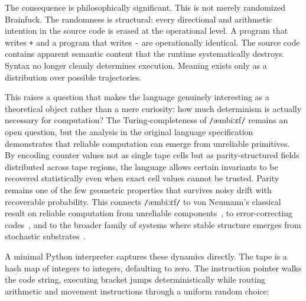 \documentclass[12pt]{article}
\newcommand{\ambibf}{%
  \texttt{/}\textnormal{æmbiːɛf}\texttt{/}%
}
\begin{document}
The consequence is philosophically significant. This is not merely randomized
Brainfuck. The randomness is structural: every directional and arithmetic
intention in the source code is erased at the operational level. A program that
writes \texttt{+} and a program that writes \texttt{-} are operationally
identical. The source code contains apparent semantic content that the runtime
systematically destroys. Syntax no longer cleanly determines execution. Meaning
exists only as a distribution over possible trajectories.

This raises a question that makes the language genuinely interesting as a
theoretical object rather than a mere curiosity: how much determinism is
actually necessary for computation? The Turing-completeness of
\ambibf{} remains an open question, but
the analysis in the original language specification demonstrates that reliable
computation can emerge from unreliable primitives. By encoding counter values
not as single tape cells but as parity-structured fields distributed across tape
regions, the language allows certain invariants to be recovered statistically
even when exact cell values cannot be trusted. Parity remains one of the few
geometric properties that survives noisy drift with recoverable probability.
This connects \ambibf{} to von Neumann's
classical result on reliable computation from unreliable components~\cite{neumann1956},
to error-correcting codes~\cite{cover2006}, and to the broader family of systems
where stable structure emerges from stochastic substrates~\cite{wolfram2002}.

A minimal Python interpreter captures these dynamics directly. The tape is a
hash map of integers to integers, defaulting to zero. The instruction pointer
walks the code string, executing bracket jumps deterministically while routing
arithmetic and movement instructions through a uniform random choice:
\end{document}
